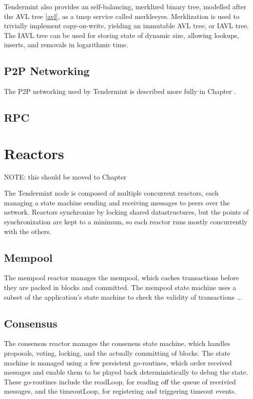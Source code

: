 Tendermint also provides an self-balancing, merklized binary tree, modelled after the AVL tree \ref{avl}, as a tmsp service called merkleeyes.
Merklization is used to trivially implement copy-on-write, yielding an immutable AVL tree, or IAVL tree.
The IAVL tree can be used for storing state of dynamic size, allowing lookups, inserts, and removals in logarithmic time.

\subsection{P2P Networking}

The P2P networking used by Tendermint is described more fully in Chapter \cite{ch:networking}.

\subsection{RPC}

\section{Reactors}

NOTE: this should be moved to Chapter \cite{ch:networking}

The Tendermint node is composed of multiple concurrent reactors, 
each managing a state machine sending and receiving messages to peers over the network.
Reactors synchronize by locking shared datastructures, but the points of synchronization are kept to a minimum,
so each reactor runs mostly concurrently with the others.

\subsection{Mempool}

The mempool reactor manages the mempool, 
which caches transactions before they are packed in blocks and committed.
The mempool state machine uses a subset of the application's state machine to check the validity of transactions ...

\subsection{Consensus}

The consensus reactor manages the consensus state machine, which handles proposals, voting, locking, 
and the actually committing of blocks.
The state machine is managed using a few persistent go-routines, 
which order received messages and enable them to be played back deterministically to debug the state.
These go-routines include the readLoop, for reading off the queue of receivied messages, 
and the timeoutLoop, for registering and triggering timeout events. 

